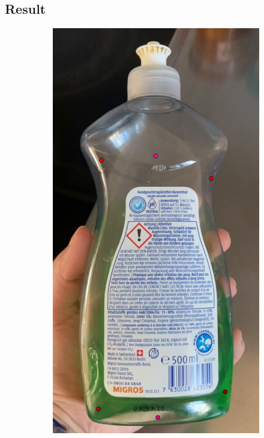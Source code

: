 \documentclass[a4paper,11pt]{report}
\begin{document}
        \subsection{Result}
            \begin{figure}[h]
                \centering
                \begin{subfigure}{0.45\textwidth}
                    \centering
                    \includegraphics[width=\textwidth]{rhlf_full_image_1.png}

\end{subfigure}
\end{figure}
\end{document}
